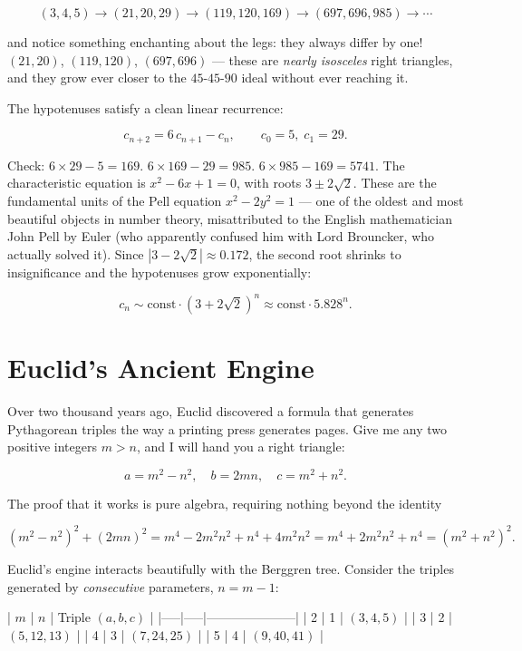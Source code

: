 \documentclass[11pt,twoside,openright]{book}
\theoremstyle{definition}
\theoremstyle{remark}
\begin{document}
\[(3,4,5) \to (21, 20, 29) \to (119, 120, 169) \to (697, 696, 985) \to \cdots\]

and notice something enchanting about the legs: they always differ by one! $(21, 20)$, $(119, 120)$, $(697, 696)$ --- these are \textit{nearly isosceles} right triangles, and they grow ever closer to the $45$-$45$-$90$ ideal without ever reaching it.

The hypotenuses satisfy a clean linear recurrence:

\[c_{n+2} = 6\,c_{n+1} - c_n, \qquad c_0 = 5,\; c_1 = 29.\]

Check: $6 \times 29 - 5 = 169$. $6 \times 169 - 29 = 985$. $6 \times 985 - 169 = 5741$. The characteristic equation is $x^2 - 6x + 1 = 0$, with roots $3 \pm 2\sqrt{2}$. These are the fundamental units of the Pell equation $x^2 - 2y^2 = 1$ --- one of the oldest and most beautiful objects in number theory, misattributed to the English mathematician John Pell by Euler (who apparently confused him with Lord Brouncker, who actually solved it). Since $|3 - 2\sqrt{2}| \approx 0.172$, the second root shrinks to insignificance and the hypotenuses grow exponentially:

\[c_n \sim \text{const} \cdot (3 + 2\sqrt{2})^n \approx \text{const} \cdot 5.828^n.\]



\section{Euclid's Ancient Engine}

Over two thousand years ago, Euclid discovered a formula that generates Pythagorean triples the way a printing press generates pages. Give me any two positive integers $m > n$, and I will hand you a right triangle:

\[a = m^2 - n^2, \quad b = 2mn, \quad c = m^2 + n^2.\]

The proof that it works is pure algebra, requiring nothing beyond the identity

\[(m^2 - n^2)^2 + (2mn)^2 = m^4 - 2m^2n^2 + n^4 + 4m^2n^2 = m^4 + 2m^2n^2 + n^4 = (m^2 + n^2)^2.\]

Euclid's engine interacts beautifully with the Berggren tree. Consider the triples generated by \textit{consecutive} parameters, $n = m - 1$:

| $m$ | $n$ | Triple $(a, b, c)$ |
|-----|-----|---------------------|
| 2   | 1   | $(3, 4, 5)$         |
| 3   | 2   | $(5, 12, 13)$       |
| 4   | 3   | $(7, 24, 25)$       |
| 5   | 4   | $(9, 40, 41)$       |
\end{document}
